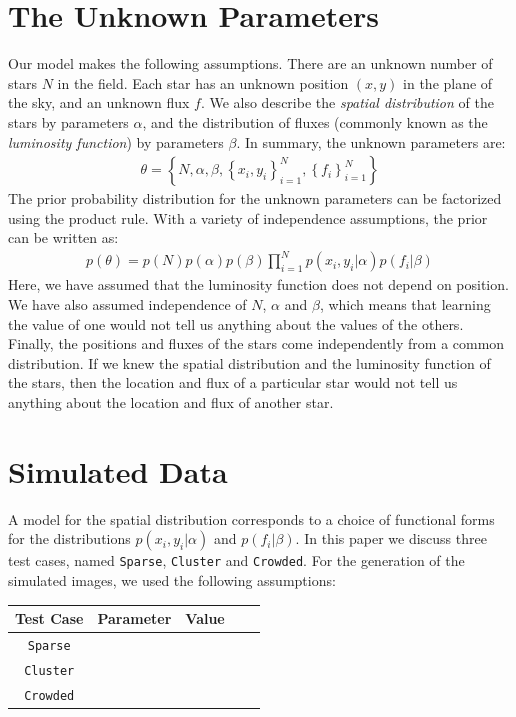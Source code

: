 \documentclass[letterpaper, 11pt]{article}
\newcommand{\sparse}{\texttt{Sparse}}
\newcommand{\cluster}{\texttt{Cluster}}
\newcommand{\crowded}{\texttt{Crowded}}
\begin{document}
\section{The Unknown Parameters}
Our model makes the following assumptions. There are an unknown number of stars
$N$ in the field. Each star has an unknown
position $(x,y)$ in the plane of the sky, and an unknown flux $f$. We also
describe the {\it spatial distribution} of the stars by parameters
$\alpha$, and the distribution of fluxes (commonly known as the {\it luminosity
function}) by parameters $\beta$. In summary, the unknown parameters are:
\begin{eqnarray}
\theta = \left\{N, \alpha, \beta, \left\{x_i, y_i\right\}_{i=1}^N, 
\left\{f_i\right\}_{i=1}^N\right\}
\end{eqnarray}
The prior probability distribution for the unknown parameters can be factorized
using the product rule. With a variety of independence assumptions, the prior
can be written as:
\begin{eqnarray}
p(\theta) = p(N)p(\alpha)p(\beta)\prod_{i=1}^N p(x_i, y_i | \alpha)
p(f_i | \beta) 
\end{eqnarray}
Here, we have assumed that the luminosity function does not depend on position.
We have also assumed independence of $N$, $\alpha$ and $\beta$, which means that
learning the value of one would not tell us anything about the values of the
others. Finally, the positions and fluxes of the stars come independently from
a common distribution. If we knew the spatial distribution and the luminosity
function of the stars, then the location and flux of a particular star would
not tell us anything about the location and flux of another star.

\section{Simulated Data}


A model for the spatial distribution corresponds to a choice of functional
forms for the distributions $p(x_i, y_i | \alpha)$ and $p(f_i | \beta)$.
In this paper we discuss three test cases, named \sparse, \cluster
and \crowded. For the generation of the simulated
images, we used the following assumptions:

\begin{table}
\begin{center}
\begin{tabular}{ccccc}
Test Case & Parameter & Value \\
\hline
\sparse \\
\cluster \\
\crowded
\end{tabular}
\end{center}
\end{table}
\end{document}
